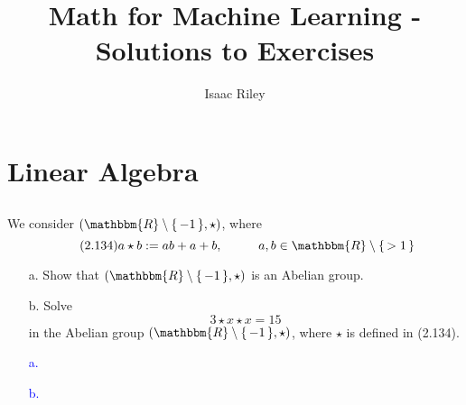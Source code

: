 \documentclass[a4paper,12pt]{article}
\title{Math for Machine Learning - Solutions to Exercises}
\author{Isaac Riley}
\newcommand{\Br}[1]{\{\, #1 \,\}}
\newcommand{\R}{\mathbbm{R}}
\begin{document}
\maketitle
\tableofcontents
\newpage



\setcounter{section}{1}
\newpage%
\section{Linear Algebra}
\subsection{}
We consider $(\R \setminus \Br{-1}, \star)$, where 
\begin{equation} \tag{2.134}
a \star b := ab+a+b, \hspace{1cm} a,b \in \R \setminus \Br{>1}
\end{equation}
\begin{itemize}
 \item [a.] Show that $(\R \setminus \Br{-1}, \star)$ is an Abelian group.
 \item [b.] Solve 
\begin{equation*}
3 \star x \star x = 15
\end{equation*}
in the Abelian group $(\R \setminus \Br{-1}, \star)$, where $\star$ is defined in (2.134).
\end{itemize}
\textcolor{blue}{
\begin{itemize}
 \item [a.] 
 \item [b.] 
\end{itemize}
}
\end{document}

